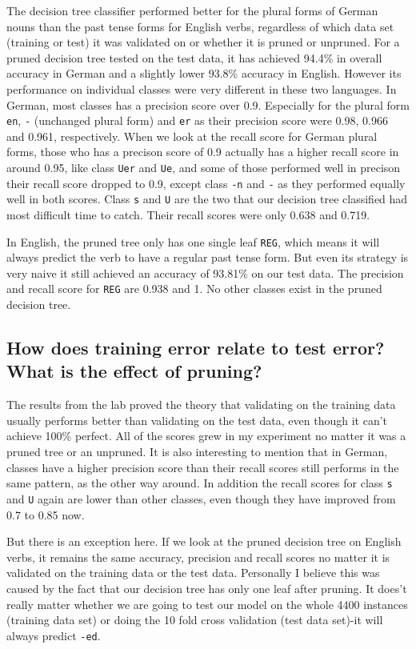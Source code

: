 \documentclass[11pt]{article} %
\begin{document}
The decision tree classifier performed better for the plural forms of German nouns than the past tense forms for English verbs, regardless of which data set (training or test) it was validated on or whether it is pruned or unpruned. For a pruned decision tree tested on the test data, it has achieved 94.4\% in overall accuracy in German and a slightly lower 93.8\% accuracy in English. However its performance on individual classes were very different in these two languages. In German, most classes has a precision score over 0.9. Especially for the plural form \verb|en|, \verb|-| (unchanged plural form) and \verb|er| as their precision score were 0.98, 0.966 and 0.961, respectively. When we look at the recall score for German plural forms, those who has a precison score of 0.9 actually has a higher recall score in around 0.95, like class \verb|Uer| and \verb|Ue|, and some of those performed well in precison their recall score dropped to 0.9, except class \verb|-n| and \verb|-| as they performed equally well in both scores. Class \verb|s| and \verb|U| are the two that our decision tree classified had most difficult time to catch. Their recall scores were only 0.638 and 0.719.

In English, the pruned tree only has one single leaf \verb|REG|, which means it will always predict the verb to have a regular past tense form. But even its strategy is very naive it still achieved an accuracy of 93.81\% on our test data. The precision and recall score for \verb|REG| are 0.938 and 1. No other classes exist in the pruned decision tree.

\subsection{How does training error relate to test error? What is the effect of pruning?}

The results from the lab proved the theory that validating on the training data usually performs better than validating on the test data, even though it can't achieve 100\% perfect. All of the scores grew in my experiment no matter it was a pruned tree or an unpruned. It is also interesting to mention that in German, classes have a higher precision score than their recall scores still performs in the same pattern, as the other way around. In addition the recall scores for class \verb|s| and \verb|U| again are lower than other classes, even though they have improved from 0.7 to 0.85 now.

But there is an exception here. If we look at the pruned decision tree on English verbs, it remains the same accuracy, precision and recall scores no matter it is validated on the training data or the test data. Personally I believe this was caused by the fact that our decision tree has only one leaf after pruning. It does't really matter whether we are going to test our model on the whole 4400 instances (training data set) or doing the 10 fold cross validation (test data set)-it will always predict \verb|-ed|.
\end{document}
